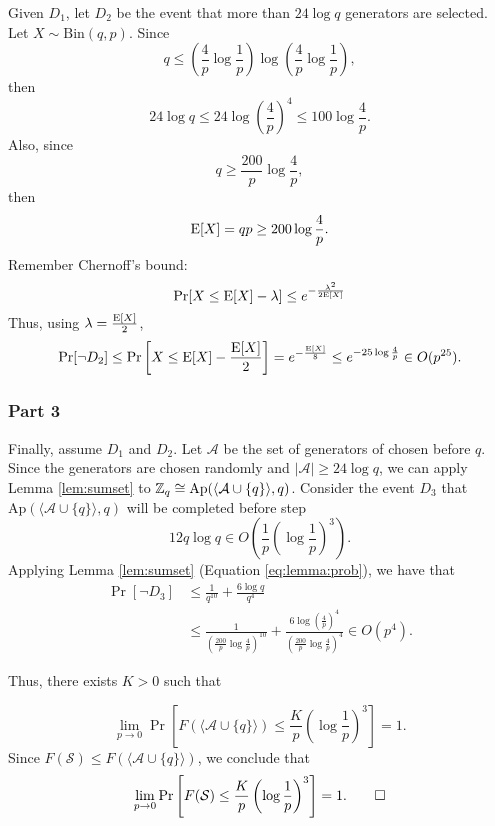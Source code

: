 Given $D_1$, let $D_2$ be the event that more than $24\log q$ generators are selected. 
    Let $X \sim \mathrm{Bin}(q, p)$. Since 
    \[q \leq \left(\frac{4}{p}\log \frac{1}{p}\right)\log\left(\frac{4}{p}\log \frac{1}{p}\right),\]
    then
    \[24\log q \leq 24\log \left(\frac{4}{p}\right)^4 \leq 100\log\frac{4}{p}.\]
    Also, since 
    \[q \geq \frac{200}{p}\log\frac{4}{p},\]
    then 
    \[\EE[X]  = qp \geq 200\log\frac{4}{p}.\]
    Remember Chernoff's bound: 
    \begin{equation}
        \Pr[X \leq \EE[X] - \lambda] \leq e^{-\frac{\lambda^2}{2\EE[X]}} 
    \end{equation}
    Thus, using $\lambda = \frac{\EE[X]}{2}$,
    \begin{equation}
        \Pr[\lnot D_2] \leq \Pr\left[X \leq \EE[X] - \frac{\EE[X]}{2}\right] = e^{-\frac{\EE[X]}{8}} \leq e^{-25\log \frac{4}{p}} \in O(p^{25}).
    \end{equation}


\subsubsection*{Part 3}

\par Finally, assume $D_1$ and $D_2$. Let $\mathcal{A}$ be the set of generators of chosen before $q$. Since the generators are chosen randomly and $|\mathcal{A}| \geq 24\log q$, we can apply Lemma \ref{lem:sumset} to $\ZZ_q \cong \mathrm{Ap}(\langle\mathcal{A}\cup\{q\}\rangle, q)$. Consider the event $D_3$ that $\mathrm{Ap}(\langle\mathcal{A}\cup\{q\}\rangle, q)$ will be completed before step \[ 12q\log q \in O\left(\frac{1}{p}\left(\log \frac{1}{p}\right)^3\right).\] 
Applying Lemma \ref{lem:sumset} (Equation \ref{eq:lemma:prob}), we have that
\begin{align*}
\Pr[\lnot D_3] &\leq \frac{1}{q^{10}} + \frac{6\log q}{q^4} \\
&\leq \frac{1}{\left(\frac{200}{p}\log \frac{4}{p}\right)^{10}}
+ \frac{6\log\left(\frac{4}{p}\right)^4}{\left(\frac{200}{p}\log\frac{4}{p}\right)^4} \in O(p^4).
\end{align*}
\par 

Thus, there exists $K > 0$ such that 

\[\lim_{p \to  0} \Pr\left[F(\langle\mathcal{A}\cup \{q\}\rangle) \leq \frac{K}{p}\left(\log \frac{1}{p}\right)^3\right] = 1.\]
Since $F(\mathcal{S}) \leq F(\langle \mathcal{A}\cup\{q\}\rangle)$, we conclude that
\[\lim_{p \to 0}\Pr\left[F(\mathcal{S}) \leq \frac{K}{p}\left(\log \frac{1}{p}\right)^3\right] = 1.\qed\]

